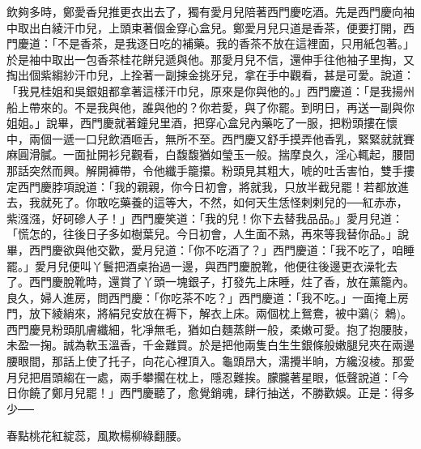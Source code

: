 \begin{showcontents}{}
飲夠多時，鄭愛香兒推更衣出去了，獨有愛月兒陪著西門慶吃酒。先是西門慶向袖中取出白綾汗巾兒，上頭束著個金穿心盒兒。鄭愛月兒只道是香茶，便要打開，西門慶道：「不是香茶，是我逐日吃的補藥。我的香茶不放在這裡面，只用紙包著。」於是袖中取出一包香茶桂花餅兒遞與他。那愛月兒不信，還伸手往他袖子里掏，又掏出個紫縐紗汗巾兒，上拴著一副揀金挑牙兒，拿在手中觀看，甚是可愛。說道：「我見桂姐和吳銀姐都拿著這樣汗巾兒，原來是你與他的。」西門慶道：「是我揚州船上帶來的。不是我與他，誰與他的？你若愛，與了你罷。到明日，再送一副與你姐姐。」說畢，西門慶就著鐘兒里酒，把穿心盒兒內藥吃了一服，把粉頭摟在懷中，兩個一遞一口兒飲酒咂舌，無所不至。西門慶又舒手摸弄他香乳，緊緊就就賽麻圓滑膩。一面扯開衫兒觀看，白馥馥猶如瑩玉一般。揣摩良久，淫心輒起，腰間那話突然而興。解開褲帶，令他纖手籠攥。粉頭見其粗大，唬的吐舌害怕，雙手摟定西門慶脖項說道：「我的親親，你今日初會，將就我，只放半截兒罷！若都放進去，我就死了。你敢吃藥養的這等大，不然，如何天生恁怪剌剌兒的──紅赤赤，紫漒漒，好砢磣人子！」西門慶笑道：「我的兒！你下去替我品品。」愛月兒道：「慌怎的，往後日子多如樹葉兒。今日初會，人生面不熟，再來等我替你品。」說畢，西門慶欲與他交歡，愛月兒道：「你不吃酒了？」西門慶道：「我不吃了，咱睡罷。」愛月兒便叫丫鬟把酒桌抬過一邊，與西門慶脫靴，他便往後邊更衣澡牝去了。西門慶脫靴時，還賞了丫頭一塊銀子，打發先上床睡，炷了香，放在薰籠內。良久，婦人進房，問西門慶：「你吃茶不吃？」西門慶道：「我不吃。」一面掩上房門，放下綾綃來，將絹兒安放在褥下，解衣上床。兩個枕上鴛鴦，被中鸂(氵鵣)。西門慶見粉頭肌膚纖細，牝凈無毛，猶如白麵蒸餅一般，柔嫩可愛。抱了抱腰肢，未盈一掬。誠為軟玉溫香，千金難買。於是把他兩隻白生生銀條般嫩腿兒夾在兩邊腰眼間，那話上使了托子，向花心裡頂入。龜頭昂大，濡攪半晌，方纔沒棱。那愛月兒把眉頭縐在一處，兩手攀擱在枕上，隱忍難挨。朦朧著星眼，低聲說道：「今日你饒了鄭月兒罷！」西門慶聽了，愈覺銷魂，肆行抽送，不勝歡娛。正是：得多少──

春點桃花紅綻蕊，風欺楊柳綠翻腰。


\end{showcontents}
